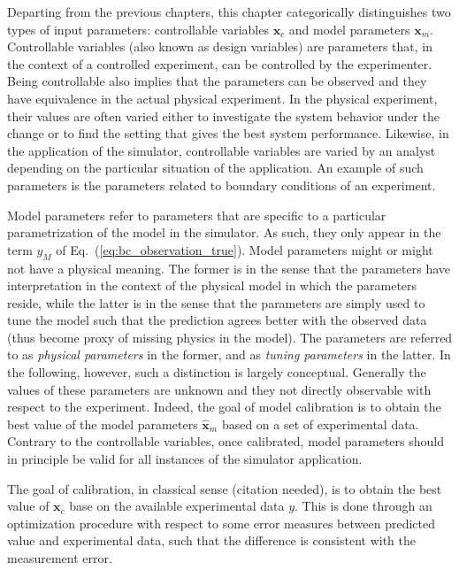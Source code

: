 Departing from the previous chapters, this chapter categorically distinguishes two types of input parameters: controllable variables $\bm{x}_c$ and model parameters $\bm{x}_m$.
Controllable variables (also known as design variables) are parameters that, in the context of a controlled experiment, can be controlled by the experimenter.
Being controllable also implies that the parameters can be observed and they have equivalence in the actual physical experiment.
In the physical experiment, their values are often varied either to investigate the system behavior under the change or to find the setting that gives the best system performance.
Likewise, in the application of the simulator, controllable variables are varied by an analyst depending on the particular situation of the application.
An example of such parameters is the parameters related to boundary conditions of an experiment.

Model parameters refer to parameters that are specific to a particular parametrization of the model in the simulator.
As such, they only appear in the term $y_M$ of Eq.~(\ref{eq:bc_observation_true}).
Model parameters might or might not have a physical meaning.
The former is in the sense that the parameters have interpretation in the context of the physical model in which the parameters reside, while the latter is in the sense that the parameters are simply used to tune the model such that the prediction agrees better with the observed data (thus become proxy of missing physics in the model).
The parameters are referred to as \emph{physical parameters} in the former,
and as \emph{tuning parameters} in the latter.
In the following, however, such a distinction is largely conceptual.
Generally the values of these parameters are unknown and they not directly observable with respect to the experiment.
Indeed, the goal of model calibration is to obtain the best value of the model parameters $\hat{\bm{x}}_m$ based on a set of experimental data.
Contrary to the controllable variables, once calibrated, model parameters should in principle be valid for all instances of the simulator application.


The goal of calibration, in classical sense (citation needed), is to obtain the best value of $\bm{x}_c$ base on the available experimental data $y$.
This is done through an optimization procedure with respect to some error measures between predicted value and experimental data, such that the difference is consistent with the measurement error.

